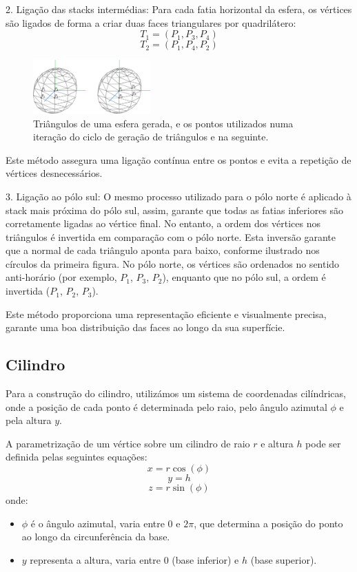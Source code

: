 \documentclass[12pt, a4paper]{article}
\begin{document}
2. Ligação das stacks intermédias:
Para cada fatia horizontal da esfera, os vértices são ligados de forma a criar duas faces
triangulares por quadrilátero:
\[
T_1 = (P_1, P_3, P_4)
\]
\[
T_2 = (P_1, P_4, P_2)
\]

\begin{figure}[H]
    \centering
    \includegraphics[width=0.4\textwidth]{res/figures/sphere.pdf}
    \caption{
        Triângulos de uma esfera gerada, e os pontos utilizados numa iteração do ciclo de geração
        de triângulos e na seguinte.
    }
\end{figure}

Este método assegura uma ligação contínua entre os pontos e evita a repetição de vértices
desnecessários.

3. Ligação ao pólo sul: O mesmo processo utilizado para o pólo norte é aplicado à stack
mais próxima do pólo sul, assim, garante que todas as fatias inferiores são corretamente ligadas ao
vértice final.
No entanto, a ordem dos vértices nos triângulos é invertida em comparação com o pólo norte.
Esta inversão garante que a normal de cada triângulo aponta para baixo, conforme ilustrado nos
círculos da primeira figura. No pólo norte, os vértices são ordenados no sentido anti-horário
(por exemplo, $P_1$, $P_3$, $P_2$), enquanto que no pólo sul, a ordem é invertida
($P_1$, $P_2$, $P_3$).

Este método proporciona uma representação eficiente e visualmente precisa, garante uma
boa distribuição das faces ao longo da sua superfície.

\subsection{Cilindro}

Para a construção do cilindro, utilizámos um sistema de coordenadas cilíndricas, onde a
posição de cada ponto é determinada pelo raio, pelo ângulo azimutal \( \phi \) e
pela altura \( y \).

A parametrização de um vértice sobre um cilindro de raio \( r \) e altura \( h \) pode ser definida
pelas seguintes equações:
\[
x = r \cos(\phi)
\]
\[
y = h
\]
\[
z = r \sin(\phi)
\]
onde:
\begin{itemize}
\item \( \phi \) é o ângulo azimutal, varia entre \( 0 \) e \( 2\pi \), que determina a
posição do ponto ao longo da circunferência da base.
\item \( y \) representa a altura, varia entre \( 0 \) (base inferior) e \( h \)
(base superior).
\end{itemize}
\end{document}
